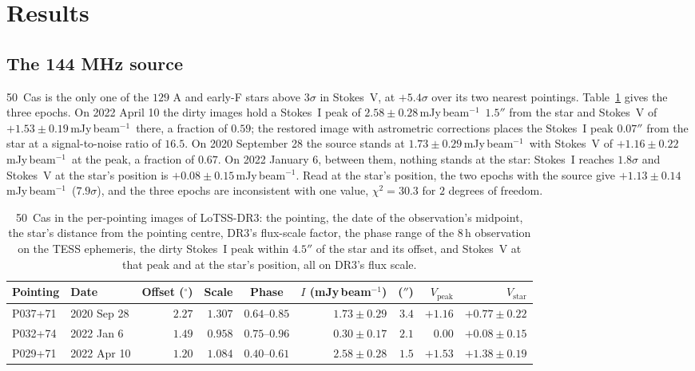 \documentclass[3p,11pt]{elsarticle}
\newcommand{\mJyb}{mJy\,beam$^{-1}$}
\begin{document}
\section{Results}\label{sec:results}

\subsection{The 144 MHz source}

50~Cas is the only one of the $129$ A and early-F stars above $3\sigma$ in Stokes~V, at
$+5.4\sigma$ over its two nearest pointings. Table~\ref{tab:lofar} gives the three
epochs. On 2022 April 10 the dirty images hold a Stokes~I peak of $2.58\pm0.28$\,\mJyb\
$1.5''$ from the star and Stokes~V of $+1.53\pm0.19$\,\mJyb\ there, a fraction of $0.59$;
the restored image with astrometric corrections places the Stokes~I peak $0.07''$ from
the star at a signal-to-noise ratio of $16.5$. On 2020 September 28 the source stands at
$1.73\pm0.29$\,\mJyb\ with Stokes~V of $+1.16\pm0.22$\,\mJyb\ at the peak, a fraction of
$0.67$. On 2022 January 6, between them, nothing stands at the star: Stokes~I reaches
$1.8\sigma$ and Stokes~V at the star's position is $+0.08\pm0.15$\,\mJyb. Read at the
star's position, the two epochs with the source give $+1.13\pm0.14$\,\mJyb\
($7.9\sigma$), and the three epochs are inconsistent with one value, $\chi^2=30.3$ for
$2$ degrees of freedom.

\begin{table}[t]
\centering\small
\caption{50~Cas in the per-pointing images of LoTSS-DR3: the pointing, the date of the
observation's midpoint, the star's distance from the pointing centre, DR3's flux-scale
factor, the phase range of the $8$\,h observation on the TESS ephemeris, the dirty
Stokes~I peak within $4.5''$ of the star and its offset, and Stokes~V at that peak and at
the star's position, all on DR3's flux scale.}
\label{tab:lofar}
\setlength{\tabcolsep}{4.5pt}
\begin{tabular}{llrrcrrrr}
\toprule
Pointing & Date & Offset ($^\circ$) & Scale & Phase & $I$ (\mJyb) & ($''$) & $V_\mathrm{peak}$ & $V_\mathrm{star}$ \\
\midrule
P037+71 & 2020 Sep 28 & $2.27$ & $1.307$ & $0.64$--$0.85$ & $1.73\pm0.29$ & $3.4$ & $+1.16$ & $+0.77\pm0.22$ \\
P032+74 & 2022 Jan 6 & $1.49$ & $0.958$ & $0.75$--$0.96$ & $0.30\pm0.17$ & $2.1$ & $0.00$ & $+0.08\pm0.15$ \\
P029+71 & 2022 Apr 10 & $1.20$ & $1.084$ & $0.40$--$0.61$ & $2.58\pm0.28$ & $1.5$ & $+1.53$ & $+1.38\pm0.19$ \\
\bottomrule
\end{tabular}
\end{table}
\end{document}
